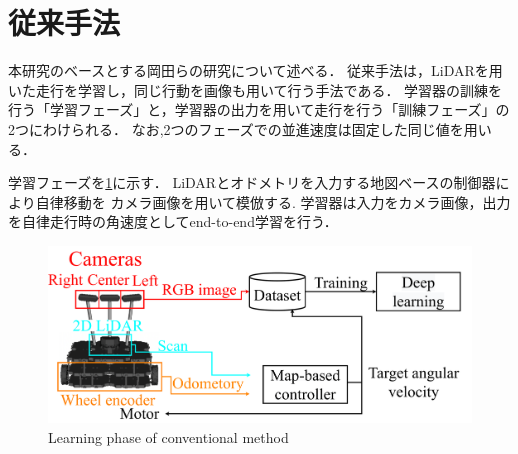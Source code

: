 \section{従来手法}
本研究のベースとする岡田らの研究について述べる．
従来手法は，LiDARを用いた走行を学習し，同じ行動を画像も用いて行う手法である．
学習器の訓練を行う「学習フェーズ」と，学習器の出力を用いて走行を行う「訓練フェーズ」の2つにわけられる．
なお,2つのフェーズでの並進速度は固定した同じ値を用いる．

学習フェーズを\ref{fig::okada_method_ler}に示す．
LiDARとオドメトリを入力する地図ベースの制御器により自律移動を
カメラ画像を用いて模倣する.
学習器は入力をカメラ画像，出力を自律走行時の角速度としてend-to-end学習を行う．
\begin{figure}[h]
    \centering
    \includegraphics[width = 12cm]{./figs/system_learning_okada.pdf}
    \caption{Learning phase of conventional method}
    \label{fig::okada_method_ler}
\end{figure}

